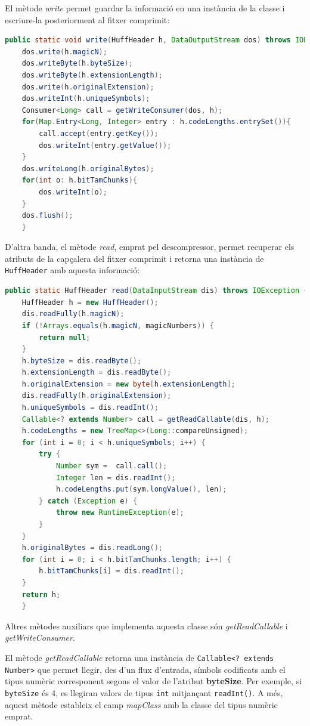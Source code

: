 \documentclass{ieeetj}
\begin{document}
El mètode \textit{write} permet guardar la informació en una instància de la classe i escriure-la posteriorment al fitxer comprimit:

\begin{lstlisting}[language = Java, breaklines = true]
public static void write(HuffHeader h, DataOutputStream dos) throws IOException {
    dos.write(h.magicN);
    dos.writeByte(h.byteSize);
    dos.writeByte(h.extensionLength);
    dos.write(h.originalExtension);
    dos.writeInt(h.uniqueSymbols);
    Consumer<Long> call = getWriteConsumer(dos, h);
    for(Map.Entry<Long, Integer> entry : h.codeLengths.entrySet()){
        call.accept(entry.getKey());
        dos.writeInt(entry.getValue());
    }
    dos.writeLong(h.originalBytes);
    for(int o: h.bitTamChunks){
        dos.writeInt(o);
    }
    dos.flush();
    }
\end{lstlisting}

D'altra banda, el mètode \textit{read}, emprat pel descompressor, permet recuperar els atributs de la capçalera del fitxer comprimit i retorna una instància de \texttt{HuffHeader} amb aquesta informació:

\begin{lstlisting}[language = Java, breaklines = true]
public static HuffHeader read(DataInputStream dis) throws IOException {
    HuffHeader h = new HuffHeader();
    dis.readFully(h.magicN);
    if (!Arrays.equals(h.magicN, magicNumbers)) {
        return null;
    }
    h.byteSize = dis.readByte();
    h.extensionLength = dis.readByte();
    h.originalExtension = new byte[h.extensionLength];
    dis.readFully(h.originalExtension);
    h.uniqueSymbols = dis.readInt();
    Callable<? extends Number> call = getReadCallable(dis, h);
    h.codeLengths = new TreeMap<>(Long::compareUnsigned);
    for (int i = 0; i < h.uniqueSymbols; i++) {
        try {
            Number sym =  call.call();
            Integer len = dis.readInt();
            h.codeLengths.put(sym.longValue(), len);
        } catch (Exception e) {
            throw new RuntimeException(e);
        }
    }
    h.originalBytes = dis.readLong();
    for (int i = 0; i < h.bitTamChunks.length; i++) {
        h.bitTamChunks[i] = dis.readInt();
    }
    return h;
    }
\end{lstlisting}

Altres mètodes auxiliars que implementa aquesta classe són \textit{getReadCallable} i \textit{getWriteConsumer}. 

El mètode \textit{getReadCallable} retorna una instància de \texttt{Callable<? extends Number>} que permet llegir, des d’un flux d’entrada, símbols codificats amb el tipus numèric corresponent segons el valor de l’atribut \textbf{byteSize}. Per exemple, si \texttt{byteSize} és 4, es llegiran valors de tipus \texttt{int} mitjançant \texttt{readInt()}. A més, aquest mètode estableix el camp \textit{mapClass} amb la classe del tipus numèric emprat.\newline
\end{document}
